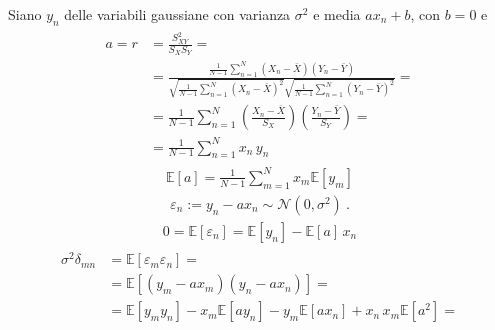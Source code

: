 \documentclass[letterpaper,10pt,italian]{jupyterBook}
\begin{document}
\sphinxAtStartPar
Siano \(y_n\) delle variabili gaussiane con varianza \(\sigma^2\) e media \(a x_n + b\), con \(b = 0\) e
\begin{equation*}
\begin{split}\begin{aligned}
  a = r
    & = \frac{S^2_{XY}}{S_X S_Y} = \\
    & = \frac{\frac{1}{N-1} \sum_{n=1}^{N} (X_n - \bar{X})(Y_n - \bar{Y})}{\sqrt{\frac{1}{N-1} \sum_{n=1}^{N} (X_n - \bar{X})^2} \sqrt{\frac{1}{N-1} \sum_{n=1}^{N} (Y_n - \bar{Y})^2}} = \\
    & = \frac{1}{N-1} \sum_{n=1}^N \left( \frac{X_n - \bar{X}}{S_X} \right)  \left(  \frac{Y_n - \bar{Y}}{S_Y} \right) = \\
    & = \frac{1}{N-1} \sum_{n=1}^N x_n \, y_n 
\end{aligned}\end{split}
\end{equation*}\begin{equation*}
\begin{split}\mathbb{E}[a] = \frac{1}{N-1} \sum_{m=1}^{N} x_m \mathbb{E}[y_m]\end{split}
\end{equation*}\begin{equation*}
\begin{split}\varepsilon_n := y_n - a x_n \sim \mathscr{N}(0, \sigma^2) \ .\end{split}
\end{equation*}\begin{equation*}
\begin{split}0 = \mathbb{E}[\varepsilon_n] = \mathbb{E}[y_n] - \mathbb{E}[a] \, x_n\end{split}
\end{equation*}\begin{equation*}
\begin{split}\begin{aligned}
  \sigma^2 \delta_{mn}
  & = \mathbb{E}\left[ \varepsilon_m \varepsilon_n \right] = \\
  & = \mathbb{E}\left[ (y_m - a x_m) (y_n - a x_n) \right] = \\
  & = \mathbb{E}\left[ y_m y_n \right] - x_m \mathbb{E} \left[ a y_n \right] -  y_m \mathbb{E} \left[ a x_n \right] + x_n \, x_m \mathbb{E}[ a^2 ] = \\
\end{aligned}\end{split}
\end{equation*}\begin{equation*}

\end{equation*}
\end{document}
